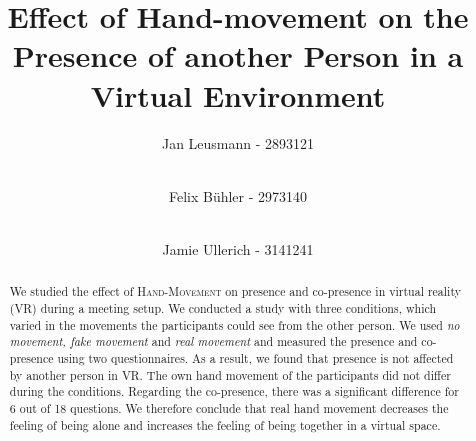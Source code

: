 \documentclass[english,runningheads,a4paper]{llncs}[2018/03/10]
\begin{document}
\title{Effect of Hand-movement on the Presence of another Person in a Virtual Environment}
{}

\author{Jan Leusmann - 2893121 \and\\ Felix Bühler - 2973140 \and\\ Jamie Ullerich - 3141241}

%
{}
%

\maketitle

\begin{abstract}
 We studied the effect of \textsc{Hand-Movement} on presence and co-presence in virtual reality (VR) during a meeting setup. 
 We conducted a study with three conditions, which varied in the movements the participants could see from the other person.
 We used \textit{no movement, fake movement} and \textit{real movement} and measured the presence and co-presence using two questionnaires. 
 As a result, we found that presence is not affected by another person in VR. 
 The own hand movement of the participants did not differ during the conditions. 
 Regarding the co-presence, there was a significant difference for 6 out of 18 questions. 
 We therefore conclude that real hand movement decreases the feeling of being alone and increases the feeling of being together in a virtual space. 
\end{abstract}

\end{document}
